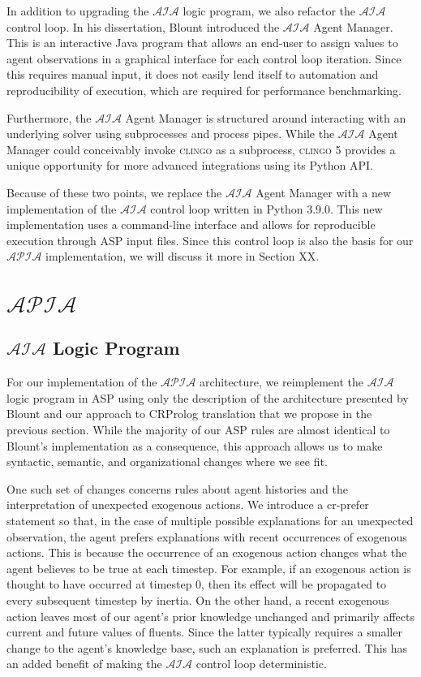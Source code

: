In addition to upgrading the $\mathcal{AIA}$ logic program, we also refactor the $\mathcal{AIA}$ control loop.
In his dissertation, Blount introduced the $\mathcal{AIA}$ Agent Manager.
This is an interactive Java program that allows an end-user to assign values to agent observations in a graphical interface for each control loop iteration.
Since this requires manual input, it does not easily lend itself to automation and reproducibility of execution, which are required for performance benchmarking.

Furthermore, the $\mathcal{AIA}$ Agent Manager is structured around interacting with an underlying solver using subprocesses and process pipes.
While the $\mathcal{AIA}$ Agent Manager could conceivably invoke \textsc{clingo} as a subprocess, \textsc{clingo} 5 provides a unique opportunity for more advanced integrations using its Python API.

Because of these two points, we replace the $\mathcal{AIA}$ Agent Manager with a new implementation of the $\mathcal{AIA}$ control loop written in Python 3.9.0.
This new implementation uses a command-line interface and allows for reproducible execution through ASP input files.
Since this control loop is also the basis for our $\mathcal{APIA}$ implementation, we will discuss it more in Section XX.

\section{$\mathcal{APIA}$}

\subsection{$\mathcal{AIA}$ Logic Program}

For our implementation of the $\mathcal{APIA}$ architecture, we re­implement the $\mathcal{AIA}$ logic program in ASP using only the description of the architecture presented by Blount and our approach to CR­Prolog translation that we propose in the previous section.
While the majority of our ASP rules are almost identical to Blount's implementation as a consequence, this approach allows us to make syntactic, semantic, and organizational changes where we see fit.

One such set of changes concerns rules about agent histories and the interpretation of unexpected exogenous actions.
We introduce a cr-prefer statement so that, in the case of multiple possible explanations for an unexpected observation, the agent prefers explanations with recent occurrences of exogenous actions.
This is because the occurrence of an exogenous action changes what the agent believes to be true at each timestep.
For example, if an exogenous action is thought to have occurred at timestep 0, then its effect will be propagated to every subsequent timestep by inertia.
On the other hand, a recent exogenous action leaves most of our agent's prior knowledge unchanged and primarily affects current and future values of fluents.
Since the latter typically requires a smaller change to the agent's knowledge base, such an explanation is preferred.
This has an added benefit of making the $\mathcal{AIA}$ control loop deterministic.

